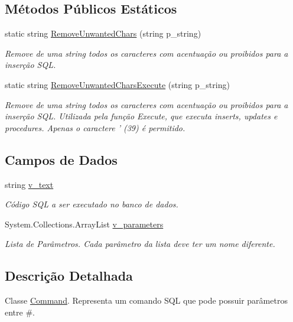 \subsection*{Métodos Públicos Estáticos}
\begin{DoxyCompactItemize}
\item 
static string \hyperlink{classSpartacus_1_1Database_1_1Command_a884d32a16239536c83f3115324bb9138}{Remove\+Unwanted\+Chars} (string p\+\_\+string)
\begin{DoxyCompactList}\small\item\em Remove de uma string todos os caracteres com acentuação ou proibidos para a inserção S\+Q\+L. \end{DoxyCompactList}\item 
static string \hyperlink{classSpartacus_1_1Database_1_1Command_ac75ed32626603bdb3575fdecc80761d5}{Remove\+Unwanted\+Chars\+Execute} (string p\+\_\+string)
\begin{DoxyCompactList}\small\item\em Remove de uma string todos os caracteres com acentuação ou proibidos para a inserção S\+Q\+L. Utilizada pela função Execute, que executa inserts, updates e procedures. Apenas o caractere ' (39) é permitido. \end{DoxyCompactList}\end{DoxyCompactItemize}
\subsection*{Campos de Dados}
\begin{DoxyCompactItemize}
\item 
string \hyperlink{classSpartacus_1_1Database_1_1Command_aac557f84f3e833295d59632f0961311e}{v\+\_\+text}
\begin{DoxyCompactList}\small\item\em Código S\+Q\+L a ser executado no banco de dados. \end{DoxyCompactList}\item 
System.\+Collections.\+Array\+List \hyperlink{classSpartacus_1_1Database_1_1Command_a5c3be946e68795c69964abc7954862a0}{v\+\_\+parameters}
\begin{DoxyCompactList}\small\item\em Lista de Parâmetros. Cada parâmetro da lista deve ter um nome diferente. \end{DoxyCompactList}\end{DoxyCompactItemize}


\subsection{Descrição Detalhada}
Classe \hyperlink{classSpartacus_1_1Database_1_1Command}{Command}. Representa um comando S\+Q\+L que pode possuir parâmetros entre \#. 




